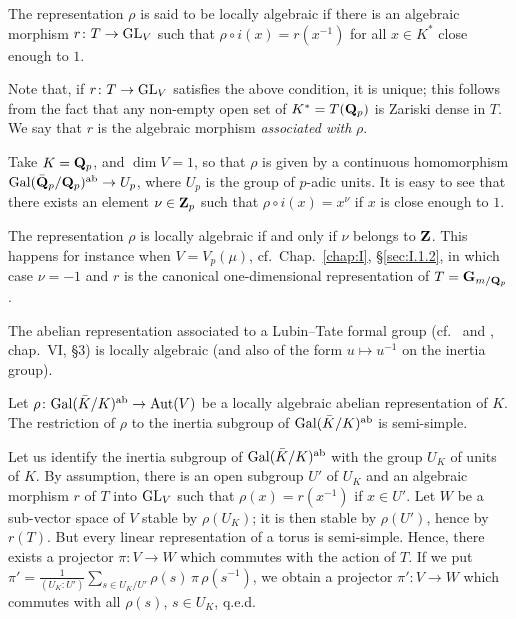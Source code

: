 \begin{dfn}
The representation $\rho$ is said to be locally algebraic if there is
an algebraic morphism $r\colon T \to \mathrm{GL}_V$ such that
$\rho\circ i(x) = r(x^{-1})$ for all $x \in K^*$ close enough to $1$.
\end{dfn}

Note that, if $r\colon T \to \mathrm{GL}_V$ satisfies the above condition, it
is unique; this follows from the fact that any non-empty open set of
$K^* = T(\mathbf{Q}_p)$ is Zariski dense in $T$.  We say that $r$ is the
algebraic morphism \emph{associated with} $\rho$.

\begin{examples}
\begin{nlist}
\item Take $K = \mathbf{Q}_p$, and $\dim V = 1$, so that $\rho$ is given by a
continuous homomorphism
$\mathrm{Gal}(\bar{\mathbf{Q}}_p/\mathbf{Q}_p)^{\mathrm{ab}} \to U_p$, where $U_p$ is the group
of $p$-adic units.  It is easy to see that there exists an element
$\nu \in \mathbf{Z}_p$ such that $\rho\circ i(x) = x^\nu$ if $x$ is close
enough to $1$.

The representation $\rho$ is locally algebraic if and only if $\nu$
belongs to $\mathbf{Z}$.  This happens for instance when $V = V_p(\mu)$,
cf.~Chap.~\ref{chap:I}, \S\ref{sec:I.1.2}, in which case $\nu = -1$ and
$r$ is the canonical one-dimensional representation of
$T = \mathbf{G}_{m/\mathbf{Q}_p}$.

\item The abelian representation associated to a Lubin--Tate formal
group (cf.~\cite{lubin-tate} and \cite{cassels-frohlich}, chap.~VI,
\S3) is locally algebraic (and also of the form $u \mapsto u^{-1}$ on
the inertia group).
\end{nlist}
\end{examples}

\begin{proposition}[1]\label{prop:III.1.1.1}
Let $\rho\colon \mathrm{Gal}(\bar K/K)^{\mathrm{ab}} \to \mathrm{Aut}(V)$ be a locally
algebraic abelian representation of $K$.  The restriction of $\rho$ to
the inertia subgroup of $\mathrm{Gal}(\bar K/K)^{\mathrm{ab}}$ is semi-simple.
\end{proposition}

Let us identify the inertia subgroup of $\mathrm{Gal}(\bar K/K)^{\mathrm{ab}}$
with the group $U_K$ of units of $K$.  By assumption, there is an open
subgroup $U'$ of $U_K$ and an algebraic morphism $r$ of $T$ into
$\mathrm{GL}_V$ such that $\rho(x) = r(x^{-1})$ if $x \in U'$.  Let $W$ be a
sub-vector space of $V$ stable by $\rho(U_K)$; it is then stable by
$\rho(U')$, hence by $r(T)$.  But every linear representation of a
torus is semi-simple.  Hence, there exists a projector
$\pi\colon V \to W$ which commutes with the action of $T$.  If we put
$\pi' = \frac{1}{(U_K:U')}\sum\limits_{s \in U_K/U'}
\rho(s)\,\pi\,\rho(s^{-1})$, we obtain a projector $\pi'\colon V \to W$
which commutes with all $\rho(s)$, $s \in U_K$, q.e.d.

